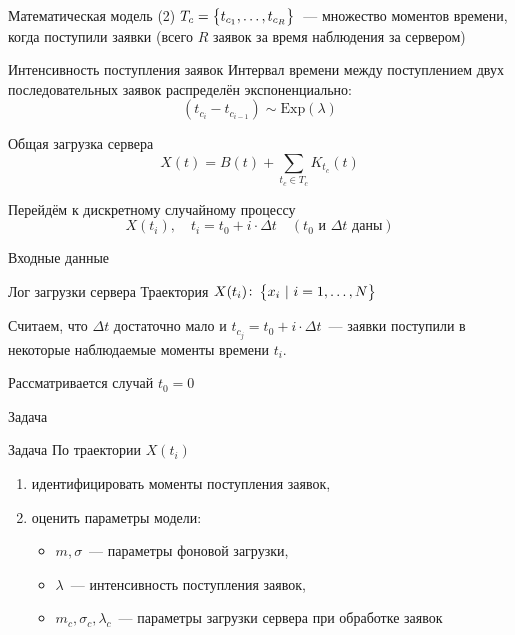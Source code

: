 \documentclass[utf8,handout]{beamer}
\begin{document}
\begin{frame}{Математическая модель (2)}
$T_c = \cbr{ t_{c_1}, \ldots, t_{c_R} }$~--- 
множество моментов времени, когда поступили заявки 
(всего $R$ заявок за время наблюдения за сервером)
\begin{block}{Интенсивность поступления заявок}
  Интервал времени между поступлением двух последовательных заявок распределён экспоненциально:
  $$(t_{c_i} - t_{c_{i-1}}) \sim \mathrm{Exp}(\lambda)$$
\end{block}
\begin{block}{Общая загрузка сервера}
  $$X(t) = B(t) + \sum\limits_{t_c \in T_c}K_{t_c}(t)$$
\end{block}
\begin{block}{Перейдём к дискретному случайному процессу}
  $$X(t_i), \quad t_i = t_0 + i \cdot \Delta t \quad 
    (t_0 \mathrm{\text{ и }} \Delta t \mathrm{\text{ даны}})$$
\end{block}
\end{frame}


\begin{frame}{Входные данные}
\begin{block}{Лог загрузки сервера}
  Траектория $X(t_i)\colon \cbr{ x_i \ \vert\ i = 1, \ldots, N }$
\end{block}
Считаем, что $\Delta t$ достаточно мало и $t_{c_j} = t_0 + i \cdot \Delta t$~---
заявки поступили в некоторые наблюдаемые моменты времени $t_i.$

Рассматривается случай $t_0 = 0$
\end{frame}


\begin{frame}{Задача}
\begin{block}{Задача}
  По траектории $X(t_i)$ 
  \begin{enumerate}
    \item идентифицировать моменты поступления заявок,
    \item оценить параметры модели:
      \begin{itemize}
        \item $m, \sigma$~--- параметры фоновой загрузки,
        \item $\lambda$~--- интенсивность поступления заявок,
        \item $m_c, \sigma_c, \lambda_c$~--- параметры загрузки сервера при обработке заявок
      \end{itemize}
  \end{enumerate}
\end{block}
\end{frame}
\end{document}
